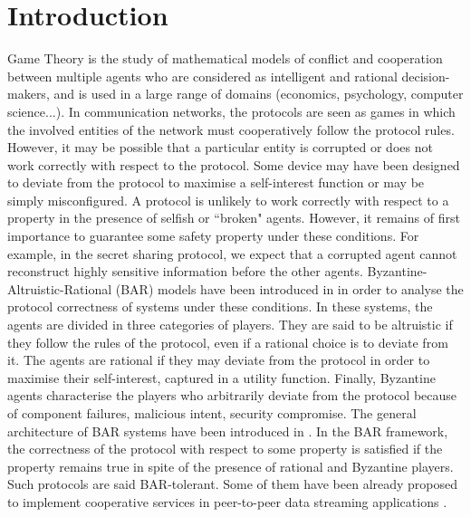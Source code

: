 \section{Introduction}
Game Theory is the study of mathematical models of conflict and cooperation between multiple agents who are considered as intelligent and rational decision-makers, and is used in a large range of domains (economics, psychology, computer science...). In communication networks, the protocols are seen as games in which the involved entities of the network must cooperatively follow the protocol rules. However, it may be possible that a particular entity is corrupted or does not work correctly with respect to the protocol. Some device may have been designed to deviate from the protocol to maximise a self-interest function or may be simply misconfigured. A protocol is unlikely to work correctly with respect to a property in the presence of selfish or ``broken" agents. However, it remains of first importance to guarantee some safety property under these conditions. For example, in the secret sharing protocol, we expect that a corrupted agent cannot reconstruct highly sensitive information before the other agents. Byzantine-Altruistic-Rational (BAR) models have been introduced in \cite{AACDMP05} in order to analyse the protocol correctness of systems under these conditions. In these systems, the agents are divided in three categories of players. They are said to be altruistic if they follow the rules of the protocol, even if a rational choice is to deviate from it. The agents are rational if they may deviate from the protocol in order to maximise their self-interest, captured in a utility function. Finally, Byzantine agents characterise the players who arbitrarily deviate from the protocol because of component failures, malicious intent, security compromise. The general architecture of BAR systems have been introduced in \cite{AACDMP05}. In the BAR framework, the correctness of the protocol with respect to some property is satisfied if the property remains true in spite of the presence of rational and Byzantine players. Such protocols are said BAR-tolerant. Some of them have been already proposed to implement cooperative services in peer-to-peer data streaming applications \cite{LCWNRAD06}.

